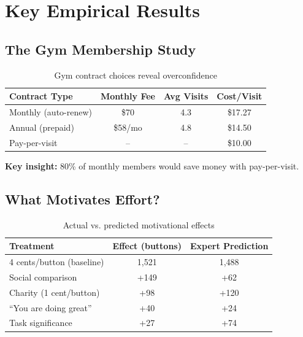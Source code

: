 \section{Key Empirical Results}

\subsection{The Gym Membership Study}

\begin{table}[h]
\centering
\begin{tabular}{lccc}
\hline
\textbf{Contract Type} & \textbf{Monthly Fee} & \textbf{Avg Visits} & \textbf{Cost/Visit} \\
\hline
Monthly (auto-renew) & \$70 & 4.3 & \$17.27 \\
Annual (prepaid) & \$58/mo & 4.8 & \$14.50 \\
Pay-per-visit & -- & -- & \$10.00 \\
\hline
\end{tabular}
\caption{Gym contract choices reveal overconfidence}
\end{table}

\textbf{Key insight:} 80\% of monthly members would save money with pay-per-visit.

\subsection{What Motivates Effort?}

\begin{table}[h]
\centering
\begin{tabular}{lcc}
\hline
\textbf{Treatment} & \textbf{Effect (buttons)} & \textbf{Expert Prediction} \\
\hline
4 cents/button (baseline) & 1,521 & 1,488 \\
Social comparison & +149 & +62 \\
Charity (1 cent/button) & +98 & +120 \\
``You are doing great'' & +40 & +24 \\
Task significance & +27 & +74 \\
\hline
\end{tabular}
\caption{Actual vs. predicted motivational effects}
\end{table}

